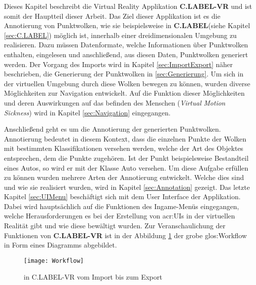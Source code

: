 \graphicspath{{Kapitel/Kapitel4_Hauptteil/Images/}}

Dieses Kapitel beschreibt die Virtual Reality Applikation \textbf{C.LABEL-VR} und ist somit der Hauptteil dieser Arbeit. Das Ziel dieser Applikation ist es die Annotierung von Punktwolken, wie sie beispielsweise in \textbf{C.LABEL}(siehe Kapitel \ref{sec:C.LABEL}) möglich ist, innerhalb einer dreidimensionalen Umgebung zu realisieren. Dazu müssen Datenformate, welche Informationen über Punktwolken enthalten, eingelesen und anschließend, aus diesen Daten, Punktwolken generiert werden. Der Vorgang des Imports wird in Kapitel \ref{sec:ImportExport} näher beschrieben, die Generierung der Punktwolken in \ref{sec:Generierung}. Um sich in der virtuellen Umgebung durch diese Wolken bewegen zu können, wurden diverse Möglichkeiten zur Navigation entwickelt. Auf die Funktion dieser Möglichkeiten und deren Auswirkungen auf das befinden des Menschen (\textit{Virtual Motion Sickness}) wird in Kapitel \ref{sec:Navigation} eingegangen. 

Anschließend geht es um die Annotierung der generierten Punktwolken. Annotierung bedeutet in diesem Kontext, dass die einzelnen Punkte der Wolken mit bestimmten Klassifikationen versehen werden, welche der Art des Objektes entsprechen, dem die Punkte zugehören. Ist der Punkt beispielsweise Bestandteil eines Autos, so wird er mit der Klasse \glqq Auto\grqq{} versehen. Um diese Aufgabe erfüllen zu können wurden mehrere Arten der Annotierung entwickelt. Welche dies sind und wie sie realisiert wurden, wird in Kapitel \ref{sec:Annotation} gezeigt. Das letzte Kapitel \ref{sec:UIMenu} beschäftigt sich mit dem User Interface der Applikation. Dabei wird hauptsächlich auf die Funktionen des Ingame-Menüs eingegangen, welche Herausforderungen es bei der Erstellung von \acrshort{acr:UI}s in der virtuellen Realität gibt und wie diese bewältigt wurden. Zur Veranschaulichung der Funktionen von \textbf{C.LABEL-VR} ist in der Abbildung \ref{fig:Workflow} der grobe \gls{glos:Workflow} in Form eines Diagramms abgebildet.

\begin{figure}%
	\centering
    \texttt{[image: Workflow]}
    \caption{ in C.LABEL-VR vom Import bis zum Export}
    \label{fig:Workflow}
\end{figure}

